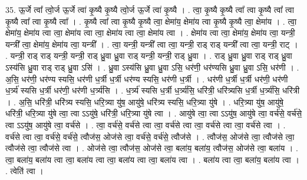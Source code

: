 \documentclass[17pt]{extarticle}
\begin{document}
35. ऊ॒र्जे त्वा᳚ त्वो॒र्ज ऊ॒र्जे त्वा॑ कृ॒ष्यै कृ॒ष्यै त्वो॒र्ज ऊ॒र्जे त्वा॑ कृ॒ष्यै । . त्वा॒ कृ॒ष्यै कृ॒ष्यै त्वा᳚ त्वा कृ॒ष्यै त्वा᳚ त्वा कृ॒ष्यै त्वा᳚ त्वा कृ॒ष्यै त्वा᳚ । . कृ॒ष्यै त्वा᳚ त्वा कृ॒ष्यै कृ॒ष्यै त्वा॒ क्षेमा॑य॒ क्षेमा॑य त्वा कृ॒ष्यै कृ॒ष्यै त्वा॒ क्षेमा॑य । . त्वा॒ क्षेमा॑य॒ क्षेमा॑य त्वा त्वा॒ क्षेमा॑य त्वा त्वा॒ क्षेमा॑य त्वा त्वा॒ क्षेमा॑य त्वा । . क्षेमा॑य त्वा त्वा॒ क्षेमा॑य॒ क्षेमा॑य त्वा॒ यन्त्री॒ यन्त्री᳚ त्वा॒ क्षेमा॑य॒ क्षेमा॑य त्वा॒ यन्त्री᳚ । . त्वा॒ यन्त्री॒ यन्त्री᳚ त्वा त्वा॒ यन्त्री॒ राड् राड् यन्त्री᳚ त्वा त्वा॒ यन्त्री॒ राट् । . यन्त्री॒ राड् राड् यन्त्री॒ यन्त्री॒ राड् ध्रु॒वा ध्रु॒वा राड् यन्त्री॒ यन्त्री॒ राड् ध्रु॒वा । . राड् ध्रु॒वा ध्रु॒वा राड् राड् ध्रु॒वा ऽस्य॑सि ध्रु॒वा राड् राड् ध्रु॒वा ऽसि॑ । . ध्रु॒वा ऽस्य॑सि ध्रु॒वा ध्रु॒वा ऽसि॒ धर॑णी॒ धर॑ण्यसि ध्रु॒वा ध्रु॒वा ऽसि॒ धर॑णी । . अ॒सि॒ धर॑णी॒ धर॑ण्य स्यसि॒ धर॑णी ध॒र्त्री ध॒र्त्री धर॑ण्य स्यसि॒ धर॑णी ध॒र्त्री । . धर॑णी ध॒र्त्री ध॒र्त्री धर॑णी॒ धर॑णी ध॒र्त्र्य॑ स्यसि ध॒र्त्री धर॑णी॒ धर॑णी ध॒र्त्र्य॑सि । . ध॒र्त्र्य॑ स्यसि ध॒र्त्री ध॒र्त्र्य॑सि॒ धरि॑त्री॒ धरि॑त्र्यसि ध॒र्त्री ध॒र्त्र्य॑सि॒ धरि॑त्री । . अ॒सि॒ धरि॑त्री॒ धरि॑त्र्य स्यसि॒ धरि॒त्र्या यु॑ष॒ आयु॑षे॒ धरि॑त्र्य स्यसि॒ धरि॒त्र्या यु॑षे । . धरि॒त्र्या यु॑ष॒ आयु॑षे॒ धरि॑त्री॒ धरि॒त्र्या यु॑षे त्वा॒ त्वा ऽऽयु॑षे॒ धरि॑त्री॒ धरि॒त्र्या यु॑षे त्वा । . आयु॑षे त्वा॒ त्वा ऽऽयु॑ष॒ आयु॑षे त्वा॒ वर्च॑से॒ वर्च॑से॒ त्वा ऽऽयु॑ष॒ आयु॑षे त्वा॒ वर्च॑से । . त्वा॒ वर्च॑से॒ वर्च॑से त्वा त्वा॒ वर्च॑से त्वा त्वा॒ वर्च॑से त्वा त्वा॒ वर्च॑से त्वा । . वर्च॑से त्वा त्वा॒ वर्च॑से॒ वर्च॑से॒ त्वौज॑स॒ ओज॑से त्वा॒ वर्च॑से॒ वर्च॑से॒ त्वौज॑से । . त्वौज॑स॒ ओज॑से त्वा॒ त्वौज॑से त्वा॒ त्वौज॑से त्वा॒ त्वौज॑से त्वा । . ओज॑से त्वा॒ त्वौज॑स॒ ओज॑से त्वा॒ बला॑य॒ बला॑य॒ त्वौज॑स॒ ओज॑से त्वा॒ बला॑य । . त्वा॒ बला॑य॒ बला॑य त्वा त्वा॒ बला॑य त्वा त्वा॒ बला॑य त्वा त्वा॒ बला॑य त्वा । . बला॑य त्वा त्वा॒ बला॑य॒ बला॑य त्वा । . त्वेति॑ त्वा । \newline
\pagebreak
{}
\end{document}
